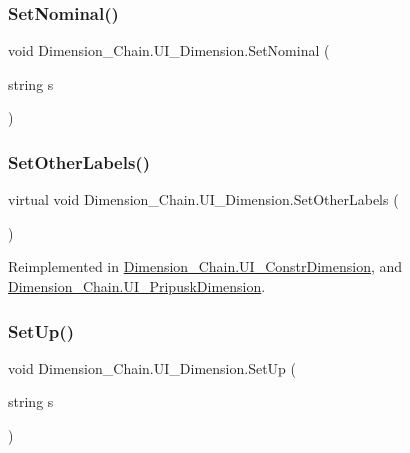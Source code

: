 \subsubsection{\texorpdfstring{Set\+Nominal()}{SetNominal()}}
{\footnotesize\ttfamily void Dimension\+\_\+\+Chain.\+U\+I\+\_\+\+Dimension.\+Set\+Nominal (\begin{DoxyParamCaption}\item[{string}]{s }\end{DoxyParamCaption})}

\mbox{\label{class_dimension___chain_1_1_u_i___dimension_a78774f971a6494a57310623f4bf0aa4f}} 
\subsubsection{\texorpdfstring{Set\+Other\+Labels()}{SetOtherLabels()}}
{\footnotesize\ttfamily virtual void Dimension\+\_\+\+Chain.\+U\+I\+\_\+\+Dimension.\+Set\+Other\+Labels (\begin{DoxyParamCaption}{ }\end{DoxyParamCaption})\hspace{0.3cm}{\ttfamily [virtual]}}



Reimplemented in \mbox{\hyperlink{class_dimension___chain_1_1_u_i___constr_dimension_a9d4992d200a4fd5fde1b6dd6ccb03c91}{Dimension\+\_\+\+Chain.\+U\+I\+\_\+\+Constr\+Dimension}}, and \mbox{\hyperlink{class_dimension___chain_1_1_u_i___pripusk_dimension_a38ee5caabaa497743eaae261898d12b1}{Dimension\+\_\+\+Chain.\+U\+I\+\_\+\+Pripusk\+Dimension}}.

\mbox{\label{class_dimension___chain_1_1_u_i___dimension_a085021a542b0342c1acb0b0f147f1d1a}} 
\subsubsection{\texorpdfstring{Set\+Up()}{SetUp()}}
{\footnotesize\ttfamily void Dimension\+\_\+\+Chain.\+U\+I\+\_\+\+Dimension.\+Set\+Up (\begin{DoxyParamCaption}\item[{string}]{s }\end{DoxyParamCaption})}

